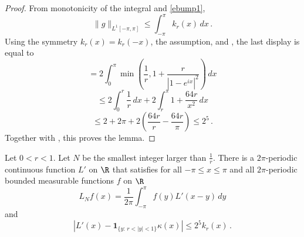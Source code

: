 \begin{proof}
From monotonicity of the integral and \eqref{ebump1},
\begin{equation}
    \|g\|_{L^1[-\pi, \pi]} \le \int_{-\pi}^{\pi}k_r(x)\, dx\,.
\end{equation}
Using the symmetry
$k_r(x)=k_r(-x)$, the assumption, and , the last display
is equal to
\begin{equation*}
    = 2 \int_0^\pi \min\left(\frac 1r, 1+\frac r{|1-e^{ix}|^2}\right)\, dx
\end{equation*}
\begin{equation*}
    \le 2\int_0^{r} \frac 1r \, dx+2\int_r^{\pi}1+\frac {64r}{x^2}\, dx
\end{equation*}
\begin{equation}
    \le 2+2\pi + 2\left(\frac {64r}r-\frac {64r}{\pi}\right)
    \le 2^{5}\, .
\end{equation}
    Together with , this proves the lemma.
\end{proof}

\begin{lemma}\label{Dirichlet-approximation}
Let $0<r<1$. Let $N$ be the smallest
integer larger than $\frac 1r$.
There is a $2\pi$-periodic continuous function
 ${L'}$ on $\R$ that satisfies for all $-\pi\le x\le \pi$
and all $2\pi$-periodic bounded measurable functions $f$ on $\R$
\begin{equation}\label{lthroughlprime}
    L_Nf(x)=\frac 1{2\pi}\int_{-\pi}^{\pi}f(y) {L'}(x-y)\, dy
\end{equation}
and
\begin{equation}\label{eqdifflhil}
    \left|L'(x)-\mathbf{1}_{\{y:\, r<|y|<1\}} \kappa(x)\right|\le 2^{5}k_r(x)\, .
\end{equation}
\end{lemma}


